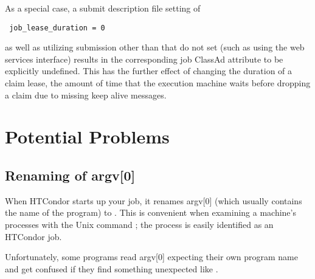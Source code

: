 As a special case, a submit description file setting of
\begin{verbatim}
 job_lease_duration = 0
\end{verbatim}
as well as utilizing submission other than 
that do not set 
(such as using the web services interface)
results in the corresponding job ClassAd attribute to be explicitly
undefined.
This has the further effect of changing the duration of a claim lease,
the amount of time that the execution machine waits before
dropping a claim due to missing keep alive messages.

\section{Potential Problems}

\subsection{\label{sec:renaming-argv}Renaming of argv[0]}

When HTCondor starts up your job, it renames argv[0] (which usually
contains the name of the program) to .
This is
convenient when examining a machine's processes with the Unix
command ; the process
is easily identified as an HTCondor job.  

Unfortunately, some programs read argv[0] expecting their own program
name and get confused if they find something unexpected like
.

